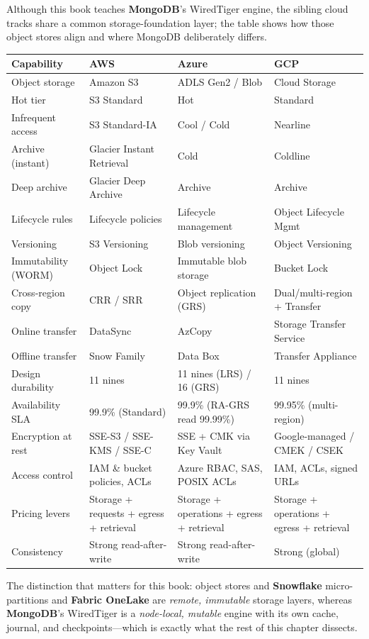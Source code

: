 \begin{crosscloud}
Although this book teaches \textbf{MongoDB}'s WiredTiger engine, the sibling cloud tracks share a common storage-foundation layer; the table shows how those object stores align and where MongoDB deliberately differs.

\vspace{2mm}
{\footnotesize
\begin{tabular}{@{}p{2.8cm}p{3.0cm}p{3.0cm}p{3.0cm}@{}}
\toprule
\textbf{Capability} & \textbf{AWS} & \textbf{Azure} & \textbf{GCP} \\
\midrule
Object storage & Amazon S3 & ADLS Gen2 / Blob & Cloud Storage \\
Hot tier & S3 Standard & Hot & Standard \\
Infrequent access & S3 Standard-IA & Cool / Cold & Nearline \\
Archive (instant) & Glacier Instant Retrieval & Cold & Coldline \\
Deep archive & Glacier Deep Archive & Archive & Archive \\
Lifecycle rules & Lifecycle policies & Lifecycle management & Object Lifecycle Mgmt \\
Versioning & S3 Versioning & Blob versioning & Object Versioning \\
Immutability (WORM) & Object Lock & Immutable blob storage & Bucket Lock \\
Cross-region copy & CRR / SRR & Object replication (GRS) & Dual/multi-region + Transfer \\
Online transfer & DataSync & AzCopy & Storage Transfer Service \\
Offline transfer & Snow Family & Data Box & Transfer Appliance \\
\addlinespace
Design durability & 11 nines & 11 nines (LRS) / 16 (GRS) & 11 nines \\
Availability SLA & 99.9\% (Standard) & 99.9\% (RA-GRS read 99.99\%) & 99.95\% (multi-region) \\
Encryption at rest & SSE-S3 / SSE-KMS / SSE-C & SSE + CMK via Key Vault & Google-managed / CMEK / CSEK \\
Access control & IAM \& bucket policies, ACLs & Azure RBAC, SAS, POSIX ACLs & IAM, ACLs, signed URLs \\
Pricing levers & Storage + requests + egress + retrieval & Storage + operations + egress + retrieval & Storage + operations + egress + retrieval \\
Consistency & Strong read-after-write & Strong read-after-write & Strong (global) \\
\bottomrule
\end{tabular}}

\vspace{1mm}
The distinction that matters for this book: object stores and \textbf{Snowflake} micro-partitions and \textbf{Fabric OneLake} are \emph{remote, immutable} storage layers, whereas \textbf{MongoDB}'s WiredTiger is a \emph{node-local, mutable} engine with its own cache, journal, and checkpoints---which is exactly what the rest of this chapter dissects.
\end{crosscloud}

